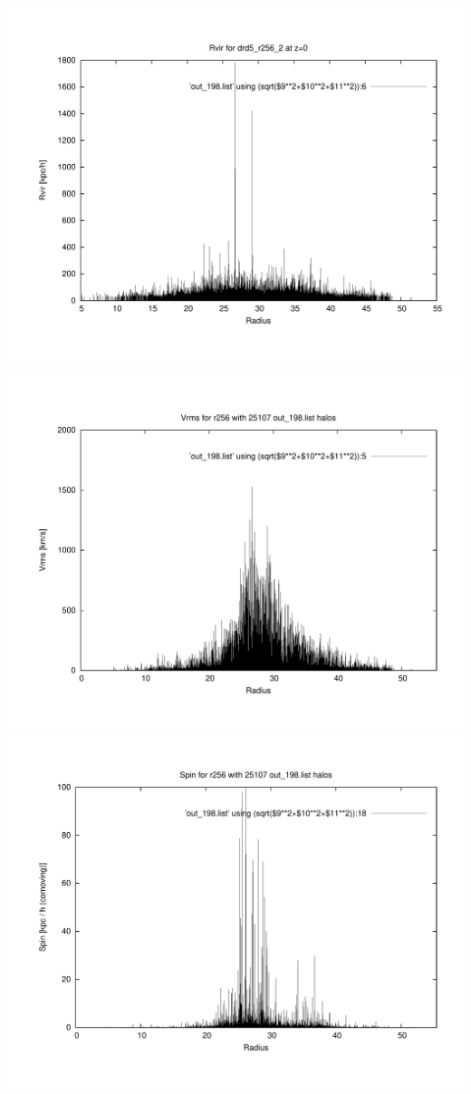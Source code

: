 \includegraphics[scale=0.3]{r256/h100/drd5_r256_2/plot_rvir_z0.pdf}

\includegraphics[scale=0.3]{r256/h100/drd5_r256_2/plot_Vrms_out_198.pdf}
\includegraphics[scale=0.3]{r256/h100/drd5_r256_2/plot_spin_out_198.pdf}

